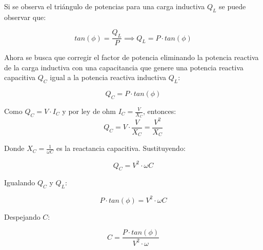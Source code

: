 Si se observa el triángulo de potencias para una carga inductiva $Q_L$ se puede observar que:

\begin{equation*}
    tan(\phi) = \frac{Q_L}{P} \implies Q_L = P \cdot tan(\phi)
\end{equation*}

Ahora se busca que corregir el factor de potencia eliminando la potencia reactiva de la carga inductiva con una capacitancia que genere una potencia reactiva capacitiva $Q_C$ igual a la potencia reactiva inductiva $Q_L$:

\begin{equation*}
    Q_C = P \cdot tan(\phi)
\end{equation*}

Como $Q_C = V \cdot I_C$ y por ley de ohm $I_C = \frac{V}{X_C}$, entonces:
\begin{equation*}
    Q_C = V \cdot \frac{V}{X_C} = \frac{V^2}{X_C}
\end{equation*}

Donde $X_C = \frac{1}{\omega C}$ es la reactancia capacitiva. Sustituyendo:

\begin{equation*}
    Q_C = V^2 \cdot \omega C
\end{equation*}

Igualando $Q_C$ y $Q_L$:

\begin{equation*}
    P \cdot tan(\phi) = V^2 \cdot \omega C
\end{equation*}

Despejando $C$:

\begin{equation*}
    C = \frac{P \cdot tan(\phi)}{V^2 \cdot \omega}
\end{equation*}